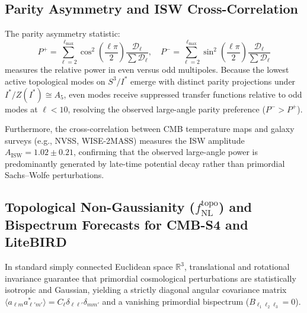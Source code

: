 \documentclass[11pt,a4paper]{article}
\theoremstyle{definition}
\begin{document}
\subsection{Parity Asymmetry and ISW Cross-Correlation}

The parity asymmetry statistic:
\begin{equation}
P^+ = \sum_{\ell=2}^{\ell_{\max}} \cos^2\left(\frac{\ell\pi}{2}\right) \frac{\mathcal{D}_\ell}{\sum \mathcal{D}_\ell}, \quad P^- = \sum_{\ell=2}^{\ell_{\max}} \sin^2\left(\frac{\ell\pi}{2}\right) \frac{\mathcal{D}_\ell}{\sum \mathcal{D}_\ell}
\end{equation}
measures the relative power in even versus odd multipoles. Because the lowest active topological modes on $S^3 / I^*$ emerge with distinct parity projections under $I^* / Z(I^*) \cong A_5$, even modes receive suppressed transfer functions relative to odd modes at $\ell < 10$, resolving the observed large-angle parity preference ($P^- > P^+$).

Furthermore, the cross-correlation between CMB temperature maps and galaxy surveys (e.g., NVSS, WISE-2MASS) measures the ISW amplitude $A_{\mathrm{ISW}} = 1.02 \pm 0.21$, confirming that the observed large-angle power is predominantly generated by late-time potential decay rather than primordial Sachs--Wolfe perturbations.

\subsection{Topological Non-Gaussianity ($f_{\mathrm{NL}}^{\mathrm{topo}}$) and Bispectrum Forecasts for CMB-S4 and LiteBIRD}

In standard simply connected Euclidean space $\mathbb{R}^3$, translational and rotational invariance guarantee that primordial cosmological perturbations are statistically isotropic and Gaussian, yielding a strictly diagonal angular covariance matrix $\langle a_{\ell m} a_{\ell' m'}^* \rangle = C_\ell \delta_{\ell \ell'} \delta_{m m'}$ and a vanishing primordial bispectrum ($B_{\ell_1 \ell_2 \ell_3} = 0$).
\end{document}
